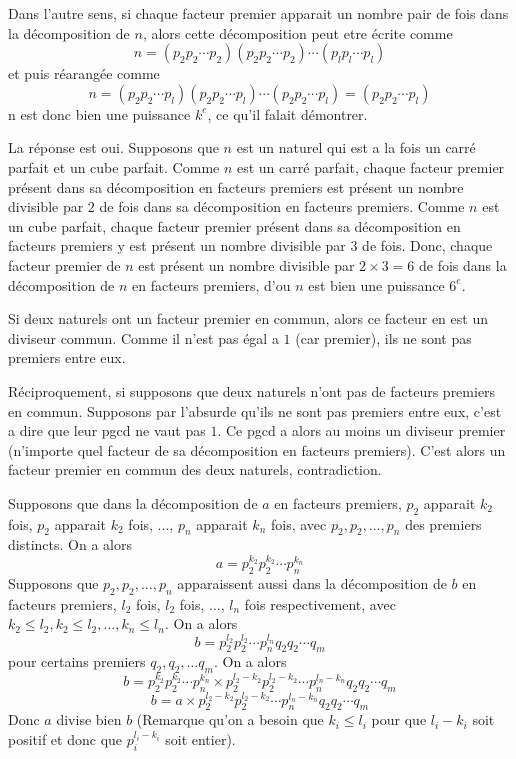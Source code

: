 Dans l'autre sens, si chaque facteur premier apparait un nombre pair de fois dans la décomposition de \(n\), alors cette décomposition peut etre écrite comme \[n = \left(p_2 p_2 \cdots p_2\right) \left(p_2 p_2 \cdots p_2\right) \cdots \left(p_{l} p_{l} \cdots p_{l}\right)\] et puis réarangée comme \[n = \left(p_2 p_2 \cdots p_{l}\right) \left(p_2 p_2 \cdots p_{l}\right) \cdots \left(p_2 p_2 \cdots p_{l}\right) = \left(p_2 p_2 \cdots p_{l}\right)\] n est donc bien une puissance \(k^{e}\), ce qu'il falait démontrer.

\sol

La réponse est oui. Supposons que \(n\) est un naturel qui est a la fois un carré parfait et un cube parfait. Comme \(n\) est un carré parfait, chaque facteur premier présent dans sa décomposition en facteurs premiers est présent un nombre divisible par \(2\) de fois dans sa décomposition en facteurs premiers. Comme \(n\) est un cube parfait, chaque facteur premier présent dans sa décomposition en facteurs premiers y est présent un nombre divisible par \(3\) de fois. Donc, chaque facteur premier de \(n\) est présent un nombre divisible par \(2 \times 3 = 6\) de fois dans la décomposition de \(n\) en facteurs premiers, d'ou \(n\) est bien une puissance \(6^{e}\).

\sol

Si deux naturels ont un facteur premier en commun, alors ce facteur en est un diviseur commun. Comme il n'est pas égal a \(1\) (car premier), ils ne sont pas premiers entre eux.

Réciproquement, si supposons que deux naturels n'ont pas de facteurs premiers en commun. Supposons par l'absurde qu'ils ne sont pas premiers entre eux, c'est a dire que leur pgcd ne vaut pas \(1\). Ce pgcd a alors au moins un diviseur premier (n'importe quel facteur de sa décomposition en facteurs premiers). C'est alors un facteur premier en commun des deux naturels, contradiction.

\sol

Supposons que dans la décomposition de \(a\) en facteurs premiers, \(p_2\) apparait \(k_2\) fois, \(p_2\) apparait \(k_2\) fois, \(\ldots\), \(p_{n}\) apparait \(k_{n}\) fois, avec \(p_2 , p_2 , \ldots , p_{n}\) des premiers distincts. On a alors
\[a = p_2 ^{k_2} p_2 ^{k_2} \cdots p_{n} ^{k_{n}}\]
Supposons que \(p_2 , p_2 , \ldots , p_{n}\) apparaissent aussi dans la décomposition de \(b\) en facteurs premiers, \(l_2\) fois, \(l_2\) fois, \(\ldots\), \(l_{n}\) fois respectivement, avec \(k_2 \leqslant l_2 , k_2 \leqslant l_2 , \ldots , k_{n} \leqslant l_{n}\). On a alors
\[b = p_2 ^{l_2} p_2 ^{l_2} \cdots p_{n} ^{l_{n}} q_2 q_2 \cdots q_{m}\]
pour certains premiers \(q_2 , q_2 , \ldots q_{m}\). On a alors
\[b = p_2 ^{k_2} p_2 ^{k_2} \cdots p_{n} ^{k_{n}} \times p_2 ^{{l_2 - k_2}} p_2 ^{{l_2 - k_2}} \cdots p_{n} ^{{l_{n} - k_{n}}} q_2 q_2 \cdots q_{m}\]
\[b = a \times p_2 ^{{l_2 - k_2}} p_2 ^{{l_2 - k_2}} \cdots p_{n} ^{{l_{n} - k_{n}}} q_2 q_2 \cdots q_{m}\]
Donc \(a\) divise bien \(b\) (Remarque qu'on a besoin que \(k_{i} \leqslant l_{i}\) pour que \(l_{i} - k_{i}\) soit positif et donc que \(p_{i} ^{{l_{i} - k_{i}}}\) soit entier).


